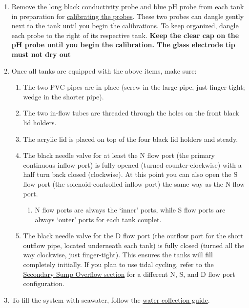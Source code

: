 \documentclass[
]{book}
\providecommand{\tightlist}{%
  \setlength{\itemsep}{0pt}\setlength{\parskip}{0pt}}
\begin{document}
\begin{enumerate}
\def\labelenumi{\arabic{enumi}.}
\tightlist
\item
  Remove the long black conductivity probe and blue pH probe from each tank in preparation for \protect\hyperlink{probe_calibrations}{calibrating the probes}. These two probes can dangle gently next to the tank until you begin the calibrations. To keep organized, dangle each probe to the right of its respective tank. \textbf{Keep the clear cap on the pH probe until you begin the calibration. The glass electrode tip must not dry out}
\item
  Once all tanks are equipped with the above items, make sure:

  \begin{enumerate}
  \def\labelenumii{\arabic{enumii}.}
  \tightlist
  \item
    The two PVC pipes are in place (screw in the large pipe, just finger tight; wedge in the shorter pipe).
  \item
    The two in-flow tubes are threaded through the holes on the front black lid holders.
  \item
    The acrylic lid is placed on top of the four black lid holders and steady.
  \item
    The black needle valve for at least the N flow port (the primary continuous inflow port) is fully opened (turned counter-clockwise) with a half turn back closed (clockwise). At this point you can also open the S flow port (the solenoid-controlled inflow port) the same way as the N flow port.

    \begin{enumerate}
    \def\labelenumiii{\arabic{enumiii}.}
    \tightlist
    \item
      N flow ports are always the `inner' ports, while S flow ports are always `outer' ports for each tank couplet.
    \end{enumerate}
  \item
    The black needle valve for the D flow port (the outflow port for the short outflow pipe, located underneath each tank) is fully closed (turned all the way clockwise, just finger-tight). This ensures the tanks will fill completely initially. If you plan to use tidal cycling, refer to the \protect\hyperlink{Overflow_into_Secondary_Sump}{Secondary Sump Overflow section} for a different N, S, and D flow port configuration.
  \end{enumerate}
\item
  To fill the system with seawater, follow the \href{06-water_collection.rmd}{water collection guide}.


\end{enumerate}
\end{document}
